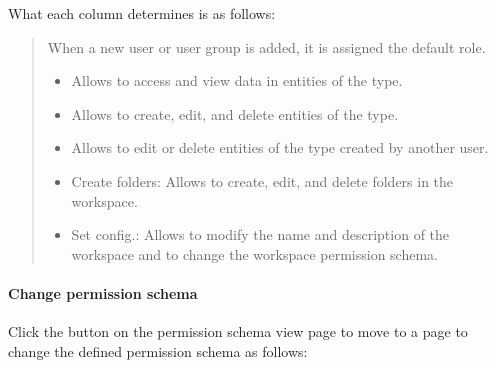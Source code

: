 \documentclass[letterpaper,10pt,english]{sphinxmanual}
\begin{document}
What each column determines is as follows:
\begin{quote}


When a new user or user group is added, it is assigned the default role.

\begin{itemize}
\item {} 
 Allows to access and view data in entities of the type.

\item {} 
 Allows to create, edit, and delete entities of the type.

\item {} 
 Allows to edit or delete entities of the type created by another user.

\end{itemize}

\begin{itemize}
\item {} 
Create folders: Allows to create, edit, and delete folders in the workspace.

\item {} 
Set config.: Allows to modify the name and description of the workspace and to change the workspace permission schema.

\end{itemize}
\end{quote}


\paragraph{Change permission schema}
\label{\detokenize{discovery/part03/shared_workspace:id7}}
Click the  button on the permission schema view page to move to a page to change the defined permission schema as follows:
\begin{quote}

\begin{figure}[H]
\centering

\noindent{}
\end{figure}
\end{quote}
\end{document}
